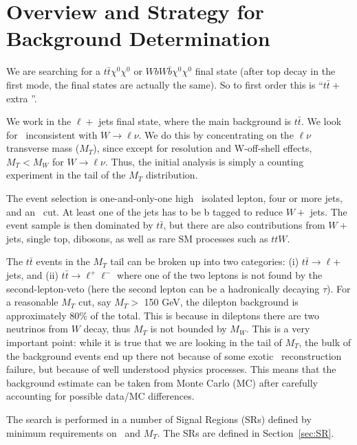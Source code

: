\section{Overview and Strategy for Background Determination}
\label{sec:overview}

We are searching for a $t\bar{t}\chi^0\chi^0$ or $W b W \bar{b} \chi^0 \chi^0$ final state
(after top decay in the first mode, the final states are actually the same).  So to first order 
this is ``$t\bar{t} +$ extra \met''.  

We work in the $\ell +$ jets final state, where the main background is $t\bar{t}$.  We look for 
\met\ inconsistent with $W \to \ell \nu$.  We do this by concentrating on the $\ell \nu$ transverse
mass ($M_T$), since except for resolution and W-off-shell effects, $M_T < M_W$ for $W \to \ell \nu$.  Thus, the
initial analysis is simply a counting experiment in the tail of the $M_T$ distribution.  

The event selection is one-and-only-one high \pt\ isolated lepton, four or more jets, and
an \met\ cut.  At least one of the jets has to be b tagged to reduce $W+$ jets.
The event sample is then dominated by $t\bar{t}$, but there are also contributions from $W+$ jets,
single top, dibosons, as well as rare SM processes such as $ttW$.


The $t\bar{t}$ events in the $M_T$ tail can be broken up into two categories: 
(i) $t\bar{t} \to \ell $+ jets, and (ii) $t\bar{t} \to \ell^+ \ell^-$ where one of the two
leptons is not found by the second-lepton-veto (here the second lepton can be a hadronically
decaying $\tau$).
 For a reasonable $M_T$ cut, say $M_T >$ 150 GeV, the dilepton background is approximately 80\% of 
the total.  This is because in dileptons there are two neutrinos from $W$ decay, thus $M_T$
is not bounded by $M_W$.  This is a very important point: while it is true that we are looking in
the tail of $M_T$, the bulk of the background events end up there not because of some exotic
\met\ reconstruction failure, but because of well understood physics processes.  This means that 
the background estimate can be taken from Monte Carlo (MC) 
after carefully accounting for possible
data/MC differences.   

The search is performed in a number of Signal Regions (SRs) defined 
by minimum requirements on \met\  and $M_T$.  The SRs
are defined in Section~\ref{sec:SR}.

